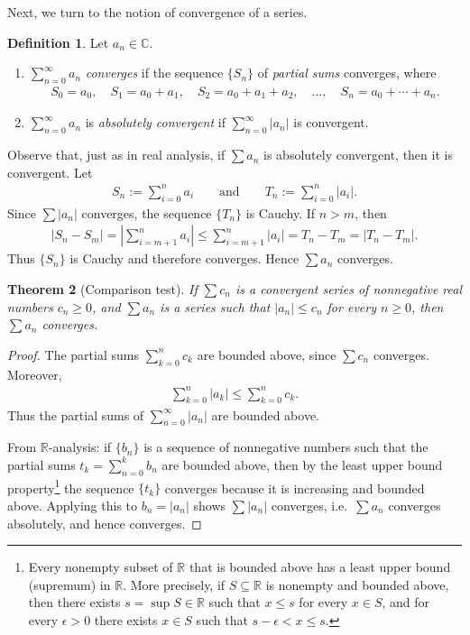 \documentclass[11pt]{article}
\theoremstyle{plain}
\newtheorem{theorem}{Theorem}[section]
\theoremstyle{definition}
\newtheorem{definition}[theorem]{Definition}
\theoremstyle{remark}
\numberwithin{equation}{section}
\newcommand{\be}{\begin{eqnarray}}
\newcommand{\ee}{\end{eqnarray}}
\newcommand{\C}{\mathbb{C}}
\newcommand{\R}{\mathbb{R}}
\begin{document}
Next, we turn to the notion of convergence of a series.


\begin{definition}
Let $a_n\in\C$.
\begin{enumerate}
\item $\displaystyle\sum_{n=0}^{\infty}a_n$ \emph{converges} if the sequence
$\{S_n\}$ of \emph{partial sums} converges, where
\be
 S_0=a_0,\quad S_1=a_0+a_1,\quad S_2=a_0+a_1+a_2,\quad\dots,\quad
 S_n=a_0+\cdots+a_n.
\ee
\item $\displaystyle\sum_{n=0}^{\infty}a_n$ is \emph{absolutely convergent}
if $\displaystyle\sum_{n=0}^{\infty}|a_n|$ is convergent.
\end{enumerate}
\end{definition}

Observe that, just as in real analysis, if $\sum a_n$ is absolutely
convergent, then it is convergent. Let
\be
 S_n:=\sum_{i=0}^n a_i
 \qquad\text{and}\qquad
 T_n:=\sum_{i=0}^n |a_i|.
\ee
Since $\sum |a_n|$ converges, the sequence $\{T_n\}$ is Cauchy. If $n>m$,
then
\be
 |S_n-S_m|
 =\left|\sum_{i=m+1}^n a_i\right|
 \leq\sum_{i=m+1}^n |a_i|
 =T_n-T_m
 =|T_n-T_m|.
\ee
Thus $\{S_n\}$ is Cauchy and therefore converges. Hence $\sum a_n$
converges.



\begin{theorem}[Comparison test]
\label{thm:comparison}
If $\sum c_n$ is a convergent series of nonnegative real numbers $c_n\ge0$,
and $\sum a_n$ is a series such that $|a_n|\le c_n$ for every $n\ge0$, then
$\sum a_n$ converges.
\end{theorem}

\begin{proof}
The partial sums $\sum_{k=0}^{n}c_k$ are bounded above, since $\sum c_n$
converges. Moreover,
\be
 \sum_{k=0}^{n}|a_k|\le\sum_{k=0}^{n}c_k.
\ee
Thus the partial sums of $\sum_{n=0}^{\infty}|a_n|$ are bounded above.

From $\R$-analysis: if $\{b_n\}$ is a sequence of nonnegative numbers such
that the partial sums $t_k=\sum_{n=0}^{k}b_n$ are bounded above, then by the
least upper bound property\footnote{Every nonempty subset of $\R$ that is
bounded above has a least upper bound (supremum) in $\R$. More precisely, if
$S\subseteq\R$ is nonempty and bounded above, then there exists
$s=\sup S\in\R$ such that $x\le s$ for every $x\in S$, and for every
$\epsilon>0$ there exists $x\in S$ such that $s-\epsilon<x\le s$.} the
sequence $\{t_k\}$ converges because it is increasing and bounded above.
Applying this to $b_n=|a_n|$ shows $\sum|a_n|$ converges,
i.e.\ $\sum a_n$ converges absolutely, and hence converges.
\end{proof}
\end{document}
